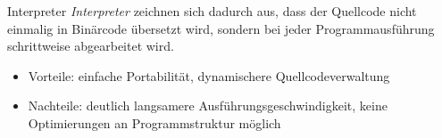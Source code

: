 \begin{defi}{Interpreter}
    \emph{Interpreter} zeichnen sich dadurch aus, dass der Quellcode nicht einmalig in Binärcode übersetzt wird, sondern bei jeder Programmausführung schrittweise abgearbeitet wird.
    \begin{itemize}
        \item Vorteile: einfache Portabilität, dynamischere Quellcodeverwaltung
        \item Nachteile: deutlich langsamere Ausführungsgeschwindigkeit, keine Optimierungen an Programmstruktur möglich
    \end{itemize}
\end{defi}
